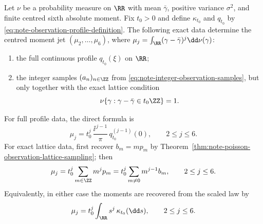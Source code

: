 \begin{theorem}%
\label{thm:note-observation-entropy-interface}
Let \(\nu\) be a probability measure on \(\RR\) with mean \(\bar{\gamma}\),
positive variance \(\sigma^2\), and finite centred sixth absolute moment.
Fix \(t_0>0\) and define \(\kappa_{t_0}\) and \(q_{t_0}\) by
\eqref{eq:note-observation-profile-definition}.  The following exact data
determine the centred moment jet
\((\mu_2,\ldots,\mu_6)\), where
\(\mu_j=\int_{\RR}(\gamma-\bar{\gamma})^j\dd\nu(\gamma)\):
\begin{enumerate}[label=\textup{(\roman*)},leftmargin=*]
\item the full continuous profile \(q_{t_0}(\xi)\) on \(\RR\);
\item the integer samples \((a_n)_{n\in\ZZ}\) from
      \eqref{eq:note-integer-observation-samples}, but only together with the
      exact lattice condition
      \[
      \nu\{\gamma:\gamma-\bar{\gamma}\in t_0\ZZ\}=1 .
      \]
\end{enumerate}
For full profile data, the direct formula is
\begin{equation}\label{eq:note-observation-interface-full-profile-moments}
\mu_j
=
t_0^j\,\frac{\ii^{\,j-1}}{\pi}\,
q_{t_0}^{(j-1)}(0),
\qquad 2\le j\le6.
\end{equation}
For exact lattice data, first recover \(b_m=mp_m\) by
Theorem~\ref{thm:note-poisson-observation-lattice-sampling}; then
\begin{equation}\label{eq:note-observation-interface-lattice-moments}
\mu_j
=
t_0^j\sum_{m\in\ZZ}m^j p_m
=
t_0^j\sum_{m\ne0}m^{j-1}b_m,
\qquad 2\le j\le6.
\end{equation}
Equivalently, in either case the moments are recovered from the scaled law by
\begin{equation}\label{eq:note-observation-interface-moments}
\mu_j=t_0^j\int_{\RR}s^j\,\kappa_{t_0}(\dd s),
\qquad 2\le j\le6.
\end{equation}
\end{theorem}

